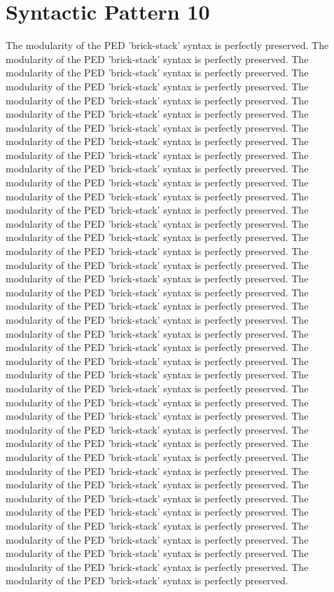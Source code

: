 \section{Syntactic Pattern 10}
The modularity of the PED 'brick-stack' syntax is perfectly preserved. The modularity of the PED 'brick-stack' syntax is perfectly preserved. The modularity of the PED 'brick-stack' syntax is perfectly preserved. The modularity of the PED 'brick-stack' syntax is perfectly preserved. The modularity of the PED 'brick-stack' syntax is perfectly preserved. The modularity of the PED 'brick-stack' syntax is perfectly preserved. The modularity of the PED 'brick-stack' syntax is perfectly preserved. The modularity of the PED 'brick-stack' syntax is perfectly preserved. The modularity of the PED 'brick-stack' syntax is perfectly preserved. The modularity of the PED 'brick-stack' syntax is perfectly preserved. The modularity of the PED 'brick-stack' syntax is perfectly preserved. The modularity of the PED 'brick-stack' syntax is perfectly preserved. The modularity of the PED 'brick-stack' syntax is perfectly preserved. The modularity of the PED 'brick-stack' syntax is perfectly preserved. The modularity of the PED 'brick-stack' syntax is perfectly preserved. The modularity of the PED 'brick-stack' syntax is perfectly preserved. The modularity of the PED 'brick-stack' syntax is perfectly preserved. The modularity of the PED 'brick-stack' syntax is perfectly preserved. The modularity of the PED 'brick-stack' syntax is perfectly preserved. The modularity of the PED 'brick-stack' syntax is perfectly preserved. The modularity of the PED 'brick-stack' syntax is perfectly preserved. The modularity of the PED 'brick-stack' syntax is perfectly preserved. The modularity of the PED 'brick-stack' syntax is perfectly preserved. The modularity of the PED 'brick-stack' syntax is perfectly preserved. The modularity of the PED 'brick-stack' syntax is perfectly preserved. The modularity of the PED 'brick-stack' syntax is perfectly preserved. The modularity of the PED 'brick-stack' syntax is perfectly preserved. The modularity of the PED 'brick-stack' syntax is perfectly preserved. The modularity of the PED 'brick-stack' syntax is perfectly preserved. The modularity of the PED 'brick-stack' syntax is perfectly preserved. The modularity of the PED 'brick-stack' syntax is perfectly preserved. The modularity of the PED 'brick-stack' syntax is perfectly preserved. The modularity of the PED 'brick-stack' syntax is perfectly preserved. The modularity of the PED 'brick-stack' syntax is perfectly preserved. The modularity of the PED 'brick-stack' syntax is perfectly preserved. The modularity of the PED 'brick-stack' syntax is perfectly preserved. The modularity of the PED 'brick-stack' syntax is perfectly preserved. The modularity of the PED 'brick-stack' syntax is perfectly preserved. The modularity of the PED 'brick-stack' syntax is perfectly preserved. The modularity of the PED 'brick-stack' syntax is perfectly preserved. 

